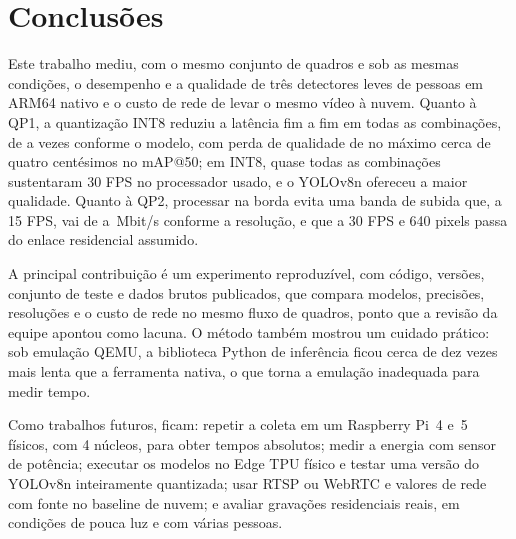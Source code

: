 \section{Conclusões}
\label{conclusoes}

Este trabalho mediu, com o mesmo conjunto de quadros e sob as mesmas condições, o desempenho e a qualidade de três detectores leves de pessoas em ARM64 nativo e o custo de rede de levar o mesmo vídeo à nuvem. Quanto à QP1, a quantização INT8 reduziu a latência fim a fim em todas as \nCombBorda{} combinações, de \razaoEffdetTres{} a \razaoYoloTres{} vezes conforme o modelo, com perda de qualidade de no máximo cerca de quatro centésimos no mAP@50; em INT8, quase todas as combinações sustentaram 30 FPS no processador usado, e o YOLOv8n ofereceu a maior qualidade. Quanto à QP2, processar na borda evita uma banda de subida que, a 15 FPS, vai de \bandaTresQuinze{} a \bandaSeisQuinze{}\,Mbit/s conforme a resolução, e que a 30 FPS e 640 pixels passa do enlace residencial assumido.

A principal contribuição é um experimento reproduzível, com código, versões, conjunto de teste e dados brutos publicados, que compara modelos, precisões, resoluções e o custo de rede no mesmo fluxo de quadros, ponto que a revisão da equipe apontou como lacuna. O método também mostrou um cuidado prático: sob emulação QEMU, a biblioteca Python de inferência ficou cerca de dez vezes mais lenta que a ferramenta nativa, o que torna a emulação inadequada para medir tempo.

Como trabalhos futuros, ficam: repetir a coleta em um Raspberry Pi~4 e~5 físicos, com 4 núcleos, para obter tempos absolutos; medir a energia com sensor de potência; executar os modelos no Edge TPU físico e testar uma versão do YOLOv8n inteiramente quantizada; usar RTSP ou WebRTC e valores de rede com fonte no baseline de nuvem; e avaliar gravações residenciais reais, em condições de pouca luz e com várias pessoas.
